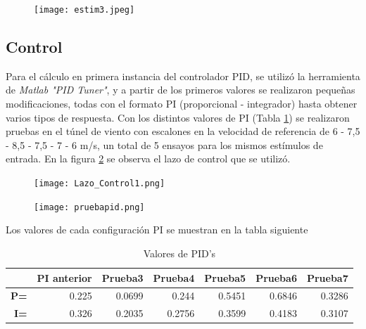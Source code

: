 \begin{figure}[H]
	\centering
	\texttt{[image: estim3.jpeg]}
	\label{fig:estim3}
\end{figure}
       
    \subsection{Control}
    Para el cálculo en primera instancia del controlador PID, se utilizó la herramienta de \textit{Matlab "PID Tuner"}, y a partir de los primeros valores se realizaron pequeñas modificaciones, todas con el formato PI (proporcional - integrador) hasta obtener varios tipos de respuesta.
    Con los distintos valores de PI (Tabla \ref{tab:pid}) se realizaron pruebas en el túnel de viento con escalones en la velocidad de referencia de 6 - 7,5 - 8,5 - 7,5 - 7 - 6 m/s,  un total de 5 ensayos para los mismos estímulos de entrada. En la figura \ref{fig:Lazo_Control} se observa el lazo de control que se utilizó. 
   
    \begin{figure}[H]
   	\centering
   	\texttt{[image: Lazo\_Control1.png]}
   	\label{fig:Lazo_Control}
   \end{figure}
    \begin{figure}[H]
    	\centering
    	\texttt{[image: pruebapid.png]}
    	\label{fig:PI3}
    \end{figure}
    
    Los valores de cada configuración PI se muestran en la tabla siguiente
    \begin{table}[H]
    	\centering
    	\begin{tabular}{r|r|r|r|r|r|r|}
    		\cline{2-7}
    		\multicolumn{1}{l|}{} & \multicolumn{1}{c|}{\textbf{PI anterior}} & \multicolumn{1}{c|}{\textbf{Prueba3}} & \multicolumn{1}{c|}{\textbf{Prueba4}} & \multicolumn{1}{c|}{\textbf{Prueba5}} & \multicolumn{1}{c|}{\textbf{Prueba6}} & \multicolumn{1}{c|}{\textbf{Prueba7}} \\ \hline
    		\multicolumn{1}{|r|}{\textbf{P=}} & 0.225 & 0.0699 & 0.244 & 0.5451 & 0.6846 & 0.3286 \\ \hline
    		\multicolumn{1}{|r|}{\textbf{I=}} & 0.326 & 0.2035 & 0.2756 & 0.3599 & 0.4183 & 0.3107 \\ \hline
    	\end{tabular}
    \caption{Valores de PID's}
    \label{tab:pid}
    \end{table}
    
